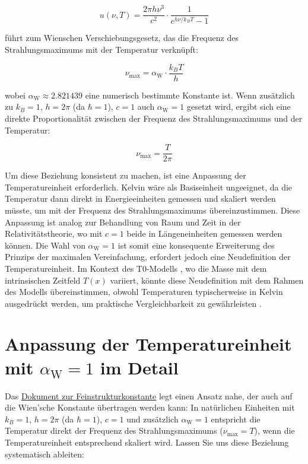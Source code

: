 \documentclass[12pt,a4paper]{article}
\newcommand{\Tfield}{T(x)}
\newcommand{\alphaW}{\alpha_{\text{W}}}
\begin{document}
	\begin{equation}
		u(\nu, T) = \frac{2\pi h \nu^3}{c^2} \cdot \frac{1}{e^{h \nu / k_B T} - 1}
	\end{equation}
	
	führt zum Wienschen Verschiebungsgesetz, das die Frequenz des Strahlungsmaximums mit der Temperatur verknüpft:
	
	\begin{equation}
		\nu_{\text{max}} = \alphaW \cdot \frac{k_B T}{h}
	\end{equation}
	
	wobei \(\alphaW \approx 2.821439\) eine numerisch bestimmte Konstante ist. Wenn zusätzlich zu \(k_B = 1\), \(h = 2\pi\) (da \(\hbar = 1\)), \(c = 1\) auch \(\alphaW = 1\) gesetzt wird, ergibt sich eine direkte Proportionalität zwischen der Frequenz des Strahlungsmaximums und der Temperatur:
	
	\begin{equation}
		\nu_{\text{max}} = \frac{T}{2\pi}
	\end{equation}
	
	Um diese Beziehung konsistent zu machen, ist eine Anpassung der Temperatureinheit erforderlich. Kelvin wäre als Basiseinheit ungeeignet, da die Temperatur dann direkt in Energieeinheiten gemessen und skaliert werden müsste, um mit der Frequenz des Strahlungsmaximums übereinzustimmen. Diese Anpassung ist analog zur Behandlung von Raum und Zeit in der Relativitätstheorie, wo mit \(c = 1\) beide in Längeneinheiten gemessen werden können. Die Wahl von \(\alphaW = 1\) ist somit eine konsequente Erweiterung des Prinzips der maximalen Vereinfachung, erfordert jedoch eine Neudefinition der Temperatureinheit. Im Kontext des T0-Modells \cite{pascher_galaxies_2025}, wo die Masse mit dem intrinsischen Zeitfeld \(\Tfield\) variiert, könnte diese Neudefinition mit dem Rahmen des Modells übereinstimmen, obwohl Temperaturen typischerweise in Kelvin ausgedrückt werden, um praktische Vergleichbarkeit zu gewährleisten \cite{pascher_messdifferenzen_2025}.
	
	\section{Anpassung der Temperatureinheit mit \(\alphaW = 1\) im Detail}
	
	Das \href{https://github.com/jpascher/T0-Time-Mass-Duality/tree/main/2/pdf/Deutsch/NatEinheitenAlpha1.pdf}{Dokument zur Feinstrukturkonstante} \cite{pascher_alpha_2025} legt einen Ansatz nahe, der auch auf die Wien'sche Konstante übertragen werden kann: In natürlichen Einheiten mit \(k_B = 1\), \(h = 2\pi\) (da \(\hbar = 1\)), \(c = 1\) und zusätzlich \(\alphaW = 1\) entspricht die Temperatur direkt der Frequenz des Strahlungsmaximums (\(\nu_{\text{max}} = T\)), wenn die Temperatureinheit entsprechend skaliert wird. Lassen Sie uns diese Beziehung systematisch ableiten:
	
\end{document}
